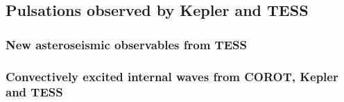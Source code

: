 {\color{blue}
\subsection{Pulsations observed by Kepler and TESS}



\subsubsection{New asteroseismic observables from TESS}

\subsubsection{Convectively excited internal waves from COROT, Kepler and TESS}


}
